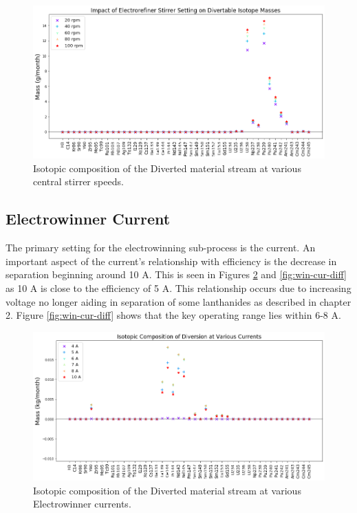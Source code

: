 \begin{figure}
	\includegraphics[width=\linewidth]{images/rotation-sa-diff}
	\caption{Isotopic composition of the Diverted material stream at various central stirrer speeds.}
	\label{fig:ref-rot-diff}
\end{figure}

\subsection{Electrowinner Current}

The primary setting for the electrowinning sub-process is the current. An important aspect of
the current's relationship with efficiency is the decrease in separation beginning around 10 A.
This is seen in Figures \ref{fig:win-cur-sa} and \ref{fig:win-cur-diff} as 10 A is close to the efficiency of 5 A. This relationship occurs due to increasing voltage no longer aiding in separation of some lanthanides as described in chapter 2. Figure \ref{fig:win-cur-diff} shows that the key operating range lies within 6-8 A.

\begin{figure}
	\includegraphics[width=\linewidth]{images/current-sa-comp}
	\caption{Isotopic composition of the Diverted material stream at various Electrowinner currents.}
	\label{fig:win-cur-sa}
\end{figure}

